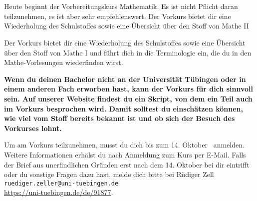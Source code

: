 \begin{description}
\ifml
	\item~ %
\else
    \item[Montag, 19. Oktober \YEAR]\ \\
  Heute beginnt der Vorbereitungskurs Mathematik. Es ist nicht Pflicht daran teilzunehmen,
	es ist aber sehr empfehlenswert.
	\ifsommersemester
	Der Vorkurs bietet dir eine Wiederholung des Schulstoffes sowie eine Übersicht über den Stoff von Mathe II
	\fi
	
	\ifwintersemester
	Der Vorkurs bietet dir eine Wiederholung des Schulstoffes sowie eine Übersicht über den Stoff von Mathe I
	\fi
	und führt dich in die Terminologie ein, die du in den Mathe-Vorlesungen wiederfinden wirst.
	
	\ifmaster
	\textbf{Wenn du deinen Bachelor nicht an der Universität Tübingen oder in einem anderen Fach erworben hast, kann der Vorkurs für dich sinnvoll sein. Auf unserer Website findest du ein Skript, von dem ein Teil auch im Vorkurs besprochen wird. Damit solltest du einschätzen können, wie viel vom Stoff bereits bekannt ist und ob sich der Besuch des Vorkurses lohnt.}
	\fi
	
    Um am Vorkurs teilzunehmen, musst du dich bis zum 14. Oktober \YEAR~anmelden. Weitere Informationen erhälst du nach Anmeldung zum Kurs per E-Mail. Falls der Brief aus unerfindlichen Gründen erst nach dem 14. Oktober bei dir eintrifft oder du sonstige Fragen dazu hast, melde dich bitte bei Rüdiger Zell \texttt{ruediger.zeller@uni-tuebingen.de}\\
    \url{https://uni-tuebingen.de/de/91877}.

	\ifsommersemester
	\fi


\end{description}
